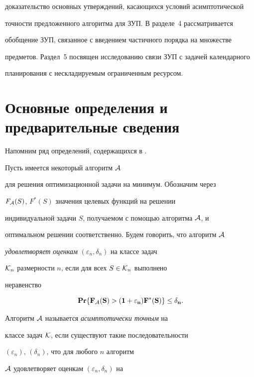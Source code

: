 доказательство основных утверждений, касающихся условий асимптотической 


точности предложенного алгоритма для ЗУП. В разделе~4 рассматривается


обобщение ЗУП, связанное с введением частичного порядка на множестве


предметов. Раздел~5 посвящен исследованию связи ЗУП с задачей календарного


планирования с нескладируемым ограниченным ресурсом.





\section{Основные определения и предварительные сведения}





Напомним ряд определений, содержащихся в \cite{GZ}.





Пусть имеется некоторый алгоритм ${\cal A}$


для решения оптимизационной задачи на минимум. Обозначим через


$F_{{\cal A}}(S)$, $F^{*}(S)$ значения целевых функций на решении


индивидуальной задачи $S$, получаемом с помощью алгоритма ${\cal A}$, и 


оптимальном решении соответственно. Будем говорить, что алгоритм ${\cal A}$ 


{\em удовлетворяет оценкам} $(\varepsilon_{n},\delta_{n})$ на классе задач 


${\cal K}_{n}$ размерности $n$, если для всех $S\in {\cal K}_{n}$ выполнено 


неравенство


$$


\PR\{F_{{\cal A}}(S) > (1+\varepsilon _{n})F^{*}(S)\} \le \delta_{n}.


$$


Алгоритм ${\cal A}$ называется {\em асимптотически точным} на


классе задач ${\cal K}$, если существуют такие последовательности 


$(\varepsilon_{n})$, $(\delta_{n})$, что для любого $n$ алгоритм 


${\cal A}$ удовлетворяет оценкам $(\varepsilon_{n},\delta_{n})$ на


